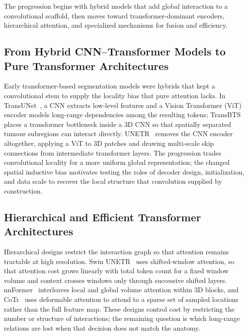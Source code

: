 \documentclass[5p,times,authoryear]{elsarticle}
\begin{document}
The progression begins with hybrid models that add global interaction to a convolutional scaffold, then moves toward transformer-dominant encoders, hierarchical attention, and specialized mechanisms for fusion and efficiency.


\subsection{From Hybrid CNN--Transformer Models to Pure Transformer Architectures}

Early transformer-based segmentation models were hybrids that kept a convolutional stem to supply the locality bias that pure attention lacks. In TransUNet~\citep{chen2021transunet}, a CNN extracts low-level features and a Vision Transformer (ViT)~\citep{dosovitskiy2021vit} encoder models long-range dependencies among the resulting tokens; TransBTS~\citep{reviewfix_wang2021transbts} places a transformer bottleneck inside a 3D CNN so that spatially separated tumour subregions can interact directly. UNETR~\citep{hatamizadeh2022unetr} removes the CNN encoder altogether, applying a ViT to 3D patches and drawing multi-scale skip connections from intermediate transformer layers. The progression trades convolutional locality for a more uniform global representation; the changed spatial inductive bias motivates testing the roles of decoder design, initialization, and data scale to recover the local structure that convolution supplied by construction.

\subsection{Hierarchical and Efficient Transformer Architectures}

Hierarchical designs restrict the interaction graph so that attention remains tractable at high resolution. Swin UNETR~\citep{hatamizadeh2022swinunetr} uses shifted-window attention, so that attention cost grows linearly with total token count for a fixed window volume and context crosses windows only through successive shifted layers. nnFormer~\citep{zhou2023nnformer} interleaves local and global volume attention within 3D blocks, and CoTr~\citep{xie2021cotr} uses deformable attention to attend to a sparse set of sampled locations rather than the full feature map. These designs control cost by restricting the number or structure of interactions; the remaining question is which long-range relations are lost when that decision does not match the anatomy.
\end{document}
